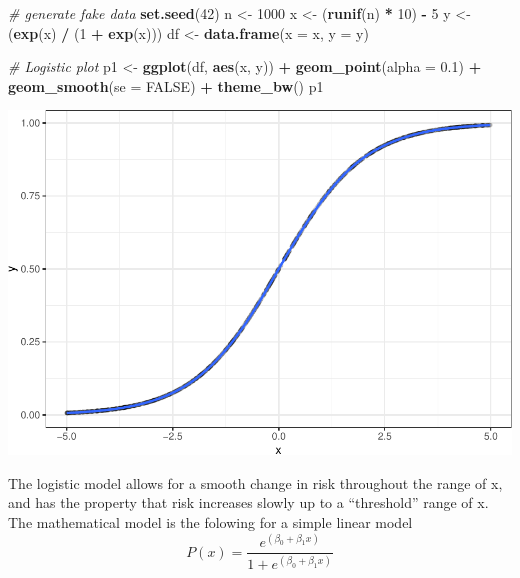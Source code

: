 \documentclass[
]{article}
\newenvironment{Shaded}{\begin{snugshade}}{\end{snugshade}}
\newcommand{\CommentTok}[1]{\textcolor[rgb]{0.56,0.35,0.01}{\textit{#1}}}
\newcommand{\DataTypeTok}[1]{\textcolor[rgb]{0.13,0.29,0.53}{#1}}
\newcommand{\DecValTok}[1]{\textcolor[rgb]{0.00,0.00,0.81}{#1}}
\newcommand{\FloatTok}[1]{\textcolor[rgb]{0.00,0.00,0.81}{#1}}
\newcommand{\KeywordTok}[1]{\textcolor[rgb]{0.13,0.29,0.53}{\textbf{#1}}}
\newcommand{\NormalTok}[1]{#1}
\newcommand{\OperatorTok}[1]{\textcolor[rgb]{0.81,0.36,0.00}{\textbf{#1}}}
\newcommand{\OtherTok}[1]{\textcolor[rgb]{0.56,0.35,0.01}{#1}}
\newcommand{\StringTok}[1]{\textcolor[rgb]{0.31,0.60,0.02}{#1}}
\begin{document}
\begin{Shaded}
\begin{Highlighting}[]
\CommentTok{# generate fake data}
\KeywordTok{set.seed}\NormalTok{(}\DecValTok{42}\NormalTok{)}
\NormalTok{n <-}\StringTok{ }\DecValTok{1000}
\NormalTok{x <-}\StringTok{ }\NormalTok{(}\KeywordTok{runif}\NormalTok{(n) }\OperatorTok{*}\StringTok{ }\DecValTok{10}\NormalTok{) }\OperatorTok{-}\StringTok{ }\DecValTok{5} 
\NormalTok{y <-}\StringTok{ }\NormalTok{(}\KeywordTok{exp}\NormalTok{(x) }\OperatorTok{/}\StringTok{ }\NormalTok{(}\DecValTok{1} \OperatorTok{+}\StringTok{ }\KeywordTok{exp}\NormalTok{(x)))}
\NormalTok{df <-}\StringTok{ }\KeywordTok{data.frame}\NormalTok{(}\DataTypeTok{x =}\NormalTok{ x, }\DataTypeTok{y =}\NormalTok{ y)}

\CommentTok{# Logistic plot}
\NormalTok{p1 <-}\StringTok{ }\KeywordTok{ggplot}\NormalTok{(df, }\KeywordTok{aes}\NormalTok{(x, y)) }\OperatorTok{+}
\StringTok{    }\KeywordTok{geom_point}\NormalTok{(}\DataTypeTok{alpha =} \FloatTok{0.1}\NormalTok{) }\OperatorTok{+}
\StringTok{    }\KeywordTok{geom_smooth}\NormalTok{(}\DataTypeTok{se =} \OtherTok{FALSE}\NormalTok{) }\OperatorTok{+}
\StringTok{    }\KeywordTok{theme_bw}\NormalTok{()}
\NormalTok{p1}
\end{Highlighting}
\end{Shaded}

\includegraphics{LogisticRegressionCh5_files/figure-latex/unnamed-chunk-7-1.pdf}

The logistic model allows for a smooth change in risk throughout the
range of x, and has the property that risk increases slowly up to a
``threshold'' range of x. The mathematical model is the folowing for a
simple linear model
\[P(x) = \frac{e^{(\beta_0 + \beta_1x)}}{1+e^{(\beta_0 + \beta_1 x)}}\]
\end{document}
